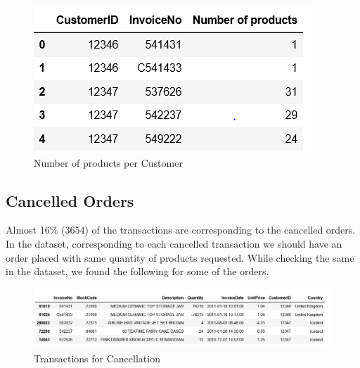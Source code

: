 \begin{figure}[H]
\caption{Number of products per Customer}
\label{2.2}
\centering
\includegraphics[width=\columnwidth]{images/2_2.PNG}
\end{figure}

\subsection{Cancelled Orders}

Almost 16\% (3654) of the transactions are corresponding to the cancelled orders. In the dataset, corresponding to each cancelled transaction we should have an order placed with same quantity of products requested. While checking the same in the dataset, we found the following for some of the orders.\\

\begin{figure}[H]
\caption{Transactions for Cancellation}
\label{2.3}
\centering
\includegraphics[width=\columnwidth]{images/2_3.PNG}
\end{figure}

